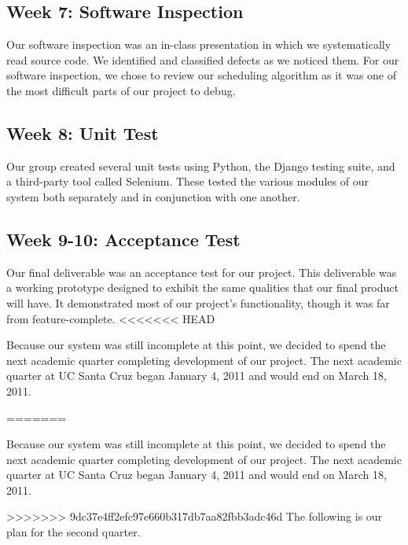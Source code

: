 \documentclass[12pt]{article}
\begin{document}
\begin{enumerate}
\begin{enumerate}
\subsection*{Week 7: Software Inspection}

Our software inspection was an in-class presentation in which we systematically read source code. We identified and classified defects as we noticed them. For our software inspection, we chose to review our scheduling algorithm as it was one of the most difficult parts of our project to debug.


\subsection*{Week 8: Unit Test}

Our group created several unit tests using Python, the Django testing suite, and a third-party tool called Selenium. These tested the various modules of our system both separately and in conjunction with one another. 

\subsection*{Week 9-10: Acceptance Test}

Our final deliverable was an acceptance test for our project. This deliverable was a working prototype designed to exhibit the same qualities that our final product will have. It demonstrated most of  our project's functionality, though it was far from feature-complete.
<<<<<<< HEAD

Because our system was still incomplete at this point, we decided to spend the next academic quarter completing development of our project. The next academic quarter at UC Santa Cruz began January 4, 2011 and would end on March 18, 2011. 

=======

Because our system was still incomplete at this point, we decided to spend the next academic quarter completing development of our project. The next academic quarter at UC Santa Cruz began January 4, 2011 and would end on March 18, 2011. 

>>>>>>> 9dc37e4ff2efc97e660b317db7aa82fbb3adc46d
The following is our plan for the second quarter. 


\end{enumerate}
\end{enumerate}
\end{document}
